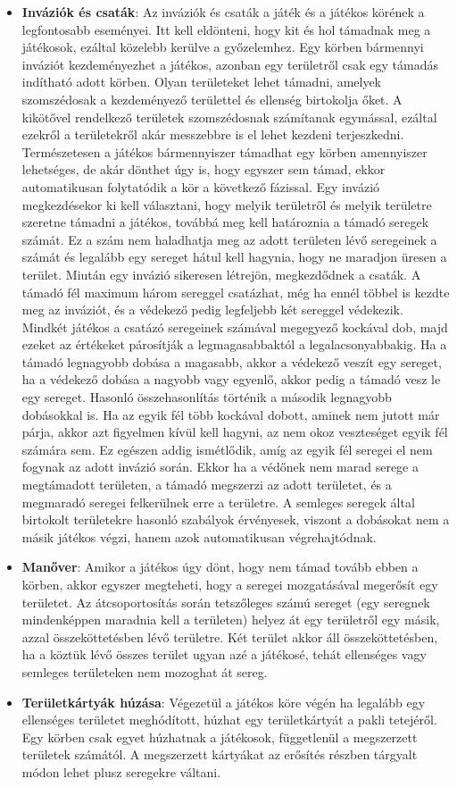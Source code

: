 \documentclass[
]{thesis-ekf}
\theoremstyle{definition}
\theoremstyle{remark}
\begin{document}
\begin{itemize}
		\item \textbf{Inváziók és csaták}: Az inváziók és csaták a játék és a játékos körének a legfontosabb eseményei. Itt kell eldönteni, hogy kit és hol támadnak meg a játékosok, ezáltal közelebb kerülve a győzelemhez. Egy körben bármennyi inváziót kezdeményezhet a játékos, azonban egy területről csak egy támadás indítható adott körben. Olyan területeket lehet támadni, amelyek szomszédosak a kezdeményező területtel és ellenség birtokolja őket. A kikötővel rendelkező területek szomszédosnak számítanak egymással, ezáltal ezekről a területekről akár messzebbre is el lehet kezdeni terjeszkedni. Természetesen a játékos bármennyiszer támadhat egy körben amennyiszer lehetséges, de akár dönthet úgy is, hogy egyszer sem támad, ekkor automatikusan folytatódik a kör a következő fázissal. Egy invázió megkezdésekor ki kell választani, hogy melyik területről és melyik területre szeretne támadni a játékos, továbbá meg kell határoznia a támadó seregek számát. Ez a szám nem haladhatja meg az adott területen lévő seregeinek a számát és legalább egy sereget hátul kell hagynia, hogy ne maradjon üresen a terület. Miután egy invázió sikeresen létrejön, megkezdődnek a csaták. A támadó fél maximum három sereggel csatázhat, még ha ennél többel is kezdte meg az inváziót, és a védekező pedig legfeljebb két sereggel védekezik. Mindkét játékos a csatázó seregeinek számával megegyező kockával dob, majd ezeket az értékeket párosítják a legmagasabbaktól a legalacsonyabbakig. Ha a támadó legnagyobb dobása a magasabb, akkor a védekező veszít egy sereget, ha a védekező dobása a nagyobb vagy egyenlő, akkor pedig a támadó vesz le egy sereget. Hasonló összehasonlítás történik a második legnagyobb dobásokkal is. Ha az egyik fél több kockával dobott, aminek nem jutott már párja, akkor azt figyelmen kívül kell hagyni, az nem okoz veszteséget egyik fél számára sem. Ez egészen addig ismétlődik, amíg az egyik fél seregei el nem fogynak az adott invázió során. Ekkor ha a védőnek nem marad serege a megtámadott területen, a támadó megszerzi az adott területet, és a megmaradó seregei felkerülnek erre a területre. A semleges seregek által birtokolt területekre hasonló szabályok érvényesek, viszont a dobásokat nem a másik játékos végzi, hanem azok automatikusan végrehajtódnak.
		\item \textbf{Manőver}: Amikor a játékos úgy dönt, hogy nem támad tovább ebben a körben, akkor egyszer megteheti, hogy a seregei mozgatásával megerősít egy területet. Az átcsoportosítás során tetszőleges számú sereget (egy seregnek mindenképpen maradnia kell a területen) helyez át egy területről egy másik, azzal összeköttetésben lévő területre. Két terület akkor áll összeköttetésben, ha a köztük lévő összes terület ugyan azé a játékosé, tehát ellenséges vagy semleges területeken nem mozoghat át sereg.
		\item \textbf{Területkártyák húzása}: Végezetül a játékos köre végén ha legalább egy ellenséges területet meghódított, húzhat egy területkártyát a pakli tetejéről. Egy körben csak egyet húzhatnak a játékosok, függetlenül a megszerzett területek számától. A megszerzett kártyákat az erősítés részben tárgyalt módon lehet plusz seregekre váltani.
	\end{itemize}
	
\end{document}

